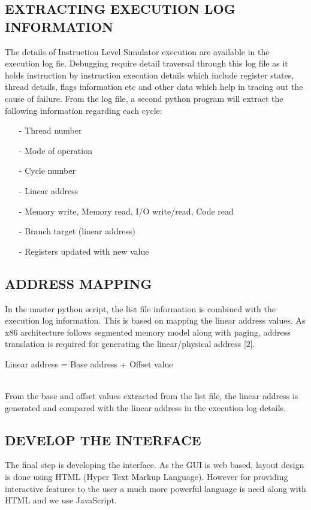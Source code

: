 \subsection {EXTRACTING EXECUTION LOG INFORMATION}
The details of Instruction Level Simulator execution are available in the execution log fie. Debugging require detail traversal through this log file as it holds instruction by instruction execution details which include register states, thread details, flags information etc and other data which help in tracing out the cause of failure. From the log file, a second python program will extract the following information regarding each cycle:

\begin{itemize}
 \item[-] Thread number
 \item[-]  Mode of operation
 \item[-]  Cycle number
 \item[-]  Linear address
 \item[-]  Memory write, Memory read, I/O write/read, Code read
 \item[-]  Branch target (linear address)
 \item[-]  Registers updated with new value
\end{itemize}


\subsection {ADDRESS MAPPING}

In the master python script, the list file information is combined with the execution log information. This is based on mapping the linear address values. As x86 architecture follows segmented memory model along with paging, address translation is required for generating the linear/physical address [2].
\\
\centerline{Linear address = Base address + Offset value}
\\
From the base and offset values extracted from the list file, the linear address is generated and compared with the linear address in the execution log details.


\subsection {DEVELOP THE INTERFACE}

The final step is developing the interface. As the GUI is web based, layout design is done using HTML (Hyper Text Markup Language). However for providing interactive features to the user a much more powerful language is need along with HTML and we use JavaScript.

